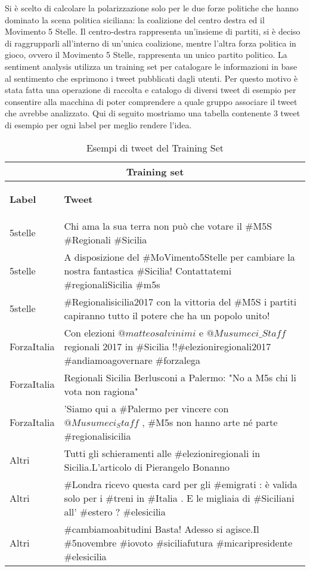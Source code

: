 Si è scelto di calcolare la polarizzazione solo per le due forze politiche che hanno dominato la scena politica siciliana: la coalizione del centro destra  ed il Movimento 5 Stelle. Il centro-destra rappresenta un'insieme di partiti, si è deciso di raggrupparli all'interno di un'unica coalizione, mentre l'altra forza politica in gioco, ovvero il Movimento 5 Stelle, rappresenta un unico partito politico.
La sentiment analysis utilizza un training set per catalogare le informazioni in base al sentimento che esprimono i tweet pubblicati dagli utenti. Per questo motivo è stata fatta una operazione di raccolta e catalogo di diversi tweet di esempio per consentire alla macchina di poter comprendere a quale gruppo associare il tweet che avrebbe analizzato.
Qui di seguito mostriamo una tabella contenente 3 tweet di esempio per ogni label per meglio rendere l'idea.
\begin{table}

\begin{tabular}{ |p{3cm}|p{10cm}| }
 \hline
 \multicolumn{2}{|c|}{\textbf{Training set}} \\
 \hline 
 \begin{center}
 \textbf{Label}
 \end{center} & \begin{center}
 \textbf{Tweet}
 \end{center}\\
 \hline
 5stelle   & Chi ama la sua terra non può che votare il \#M5S \#Regionali \#Sicilia  \\ \hline
 5stelle & A disposizione del \#MoVimento5Stelle per cambiare la nostra fantastica \#Sicilia! Contattatemi \#regionaliSicilia \#m5s\\ \hline
 5stelle & \#Regionalisicilia2017 con la vittoria del \#M5S i partiti capiranno tutto il potere che ha un popolo unito! \\ \hline
 ForzaItalia &   Con elezioni $ @matteosalvinimi$ e $@Musumeci\_Staff$ regionali 2017 in \#Sicilia !!\#elezioniregionali2017 \#andiamoagovernare \#forzalega  \\ \hline
 ForzaItalia & Regionali Sicilia  Berlusconi a Palermo: "No a M5s chi li vota non ragiona" \\ \hline
 ForzaItalia & 'Siamo qui a \#Palermo per vincere con $@Musumeci_Staff$ , \#M5s non hanno arte né parte \#regionalisicilia \\ \hline
Altri & Tutti gli schieramenti alle \#elezioniregionali in Sicilia.L'articolo di Pierangelo Bonanno \\ \hline
Altri & \#Londra ricevo questa card per gli \#emigrati : è valida solo per i \#treni in \#Italia . E le migliaia di \#Siciliani all' \#estero ? \#elesicilia \\ \hline
Altri & \#cambiamoabitudini Basta! Adesso si agisce.Il \#5novembre \#iovoto \#siciliafutura \#micaripresidente \#elesicilia\\
 \hline
\end{tabular}
\caption{Esempi di tweet del Training Set}
 \label{trainingSetExample}
\end{table}

